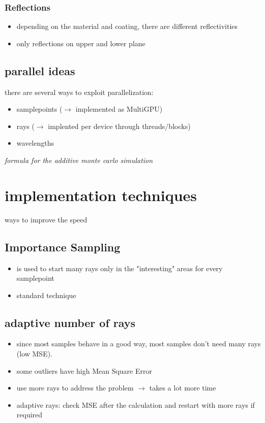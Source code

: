 \documentclass[a4paper,11pt]{article}
\begin{document}
\subsubsection{Reflections}
\begin{itemize}
  \item depending on the material and coating, there are different reflectivities
  \item only reflections on upper and lower plane
\end{itemize}

\subsection{parallel ideas}
there are several ways to exploit parallelization:
\begin{itemize}
  \item samplepoints ($\rightarrow$ implemented as MultiGPU)
  \item rays ($\rightarrow$ implented per device through threads/blocks)
  \item wavelengths
\end{itemize}
\textit{formula for the additive monte carlo simulation}


\section{implementation techniques}
ways to improve the speed
\subsection{Importance Sampling}
\begin{itemize}
  \item is used to start many rays only in the "interesting" areas for every samplepoint
  \item standard technique
\end{itemize}

\subsection{adaptive number of rays}
\begin{itemize}
  \item since most samples behave in a good way, most samples don't need many rays (low MSE).
  \item some outliers have high Mean Square Error
  \item use more rays to address the problem $\rightarrow$ takes a lot more time
  \item adaptive rays: check MSE after the calculation and restart with more rays if required
\end{itemize}
\end{document}
